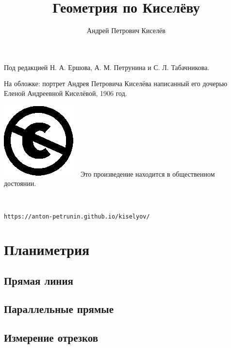 \documentclass[twoside]{book}
\begin{document}
\cleardoublepage
\frontmatter
\title{Геометрия по Киселёву}
\author{Андрей Петрович Киселёв}
\date{}
\maketitle

\thispagestyle{empty}

Под редакцией Н. А. Ершова, А. М. Петрунина и С. Л. Табачникова.

На обложке: портрет  Андрея Петровича Киселёва написанный его дочерью Еленой Андреевной Киселёвой, 1906 год.

\vfill

\noindent
\includegraphics[scale=.25]{eps/Cc-public_domain_mark_white}\ \ 
Это произведение находится в общественном достоянии.

\ 

\noindent\texttt{https://anton-petrunin.github.io/kiselyov/} 

\mainmatter




\part{Планиметрия}

\chapter{Прямая линия}





\chapter{Параллельные прямые}










\chapter{Измерение отрезков}


\end{document}
